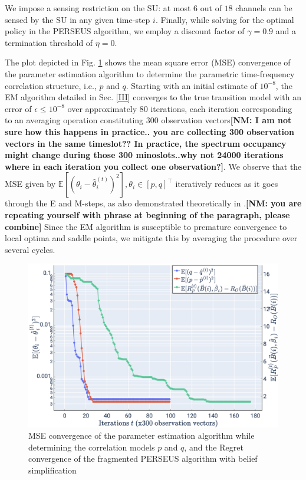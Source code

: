 \documentclass[10pt,twocolumn]{IEEEtran}
\newcommand{\nm}[1]{{\color{blue}\bf{[NM: #1]}}}
\begin{document}
We impose a sensing restriction on the SU: at most $6$ out of $18$ channels can be sensed by the SU in any given time-step $i$. Finally, while solving for the optimal policy in the PERSEUS algorithm, we employ a discount factor of $\gamma{=}0.9$ and a termination threshold of $\eta{=}0$.

The plot depicted in Fig. \ref{fig:4} shows the mean square error (MSE) convergence of the parameter estimation algorithm to determine the parametric time-frequency correlation structure, i.e., $p$ and $q$. Starting with an initial estimate of $10^{-8}$, the EM algorithm detailed in Sec. \ref{III} converges to the true transition model with an error of $\epsilon{\leq}10^{-8}$ over approximately 80 iterations, each iteration corresponding to an averaging operation constituting 300 observation vectors\nm{I am not sure how this happens in practice.. you are collecting 300 observation vectors in the same timeslot?? In practice, the spectrum occupancy might change during those 300 minoslots..why not 24000 iterations where in each iteration you collect one observation?}. We observe that the MSE given by $\mathbb{E}[(\theta_{i}{-}\hat{\theta}_{i}^{(t)})^{2}],\theta_{i}{\in}[p,q]^{\intercal}$ iteratively reduces as it goes through the E and M-steps, as also demonstrated theoretically in  \cite{Neal1998}.\nm{you are repeating yourself with phrase at beginning of the paragraph, please combine} Since the EM algorithm is susceptible to premature convergence to local optima and saddle points, we mitigate this by averaging the procedure over several cycles.
\begin{figure}
    \centering
    \includegraphics[width=0.80\linewidth]{PerseusRegretConvergence_MeanSquareErrorConvergence.png}
    \caption{MSE convergence of the parameter estimation algorithm while determining the correlation models $p$ and $q$, and the Regret convergence of the fragmented PERSEUS algorithm with belief simplification}
    \vspace{-4mm}
    \label{fig:4}
\end{figure}
\end{document}
